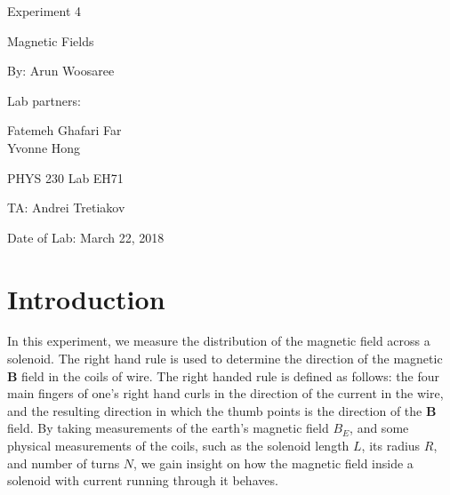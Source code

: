 \documentclass[letterpaper]{article}
\begin{document}
  \begin{titlepage}
    \begin{center}
        \vspace*{1cm}
        \Huge
        Experiment 4
        \vspace{1cm}

        Magnetic Fields
        \vspace{1cm}

        By: Arun Woosaree
        \vspace{1cm}

        Lab partners:
        \vspace{.25cm}
        \Large

        Fatemeh Ghafari Far\\
        \vspace{.25cm}
        Yvonne Hong
        \vspace{1cm}

        \Huge
        PHYS 230 Lab EH71
        \vspace{1cm}

        TA: Andrei Tretiakov
        \vspace{1cm}

        Date of Lab: March 22, 2018%
        \vfill
    \end{center}
\end{titlepage}

\section{Introduction}

In this experiment, we measure the distribution of the magnetic field across a solenoid.
The right hand rule is used to determine the
direction of the magnetic $\textbf{B}$ field in the coils of wire. The right handed rule
is defined as follows: the four main fingers of one's right hand curls in the direction of the
current in the wire, and the resulting direction in which the thumb points is the direction of the
$\textbf{B}$ field. By taking measurements of the earth's magnetic field $B_E$, and some physical measurements
of the coils, such as the solenoid length $L$, its radius $R$, and number of turns $N$, we gain insight
on how the magnetic field inside a solenoid with current running through it behaves.
\end{document}
